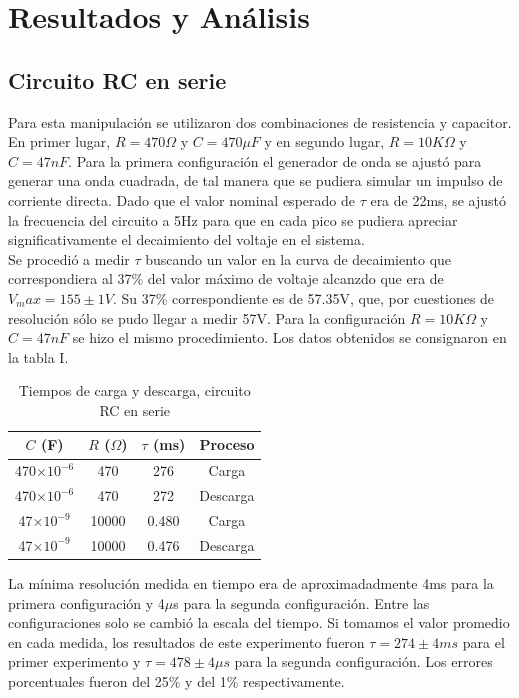 \documentclass[%
 reprint,
 amsmath,amssymb,
 aps,
]{revtex4-1}
\begin{document}
\section{\label{sec:level1}Resultados y An\'alisis}

\subsection{\label{sec:level2}Circuito RC en serie}
Para esta manipulaci\'on se utilizaron dos combinaciones de resistencia y capacitor. En primer lugar, $R = 470\Omega$ y $C=470\mu F$ y en segundo lugar, $R=10K\Omega$ y $C = 47nF$. Para la primera configuraci\'on el generador de onda se ajust\'o para generar una onda cuadrada, de tal manera que se pudiera simular un impulso de corriente directa. Dado que el valor nominal esperado de $\tau$ era de 22ms, se ajust\'o la frecuencia del circuito a 5Hz para que en cada pico se pudiera apreciar significativamente el decaimiento del voltaje en el sistema.\\

Se procedi\'o a medir $\tau$ buscando un valor en la curva de decaimiento que correspondiera al 37\% del valor m\'aximo de voltaje alcanzdo que era de $V_max=155\pm 1V$. Su 37\% correspondiente es de 57.35V, que, por cuestiones de resoluci\'on s\'olo se pudo llegar a medir 57V. Para la configuración $R=10K\Omega$ y $C = 47nF$ se hizo el mismo procedimiento. Los datos obtenidos se consignaron en la tabla I.\\

\begin{table}[h!]
\centering
\begin{tabular}{|c|c|c|c|}
\hline
$C$ (F) & $R$ ($\Omega$) & $\tau$ (ms) & Proceso\\
\hline
470$\times 10^{-6}$ & 470 & 276 & Carga\\
470$\times 10^{-6}$ & 470 & 272 & Descarga\\
47$\times 10^{-9}$ & 10000 & 0.480 & Carga\\
47$\times 10^{-9}$ & 10000 & 0.476 & Descarga\\
\hline
\end{tabular}
\caption{Tiempos de carga y descarga, circuito RC en serie}
\end{table}

La mínima resolución medida en tiempo era de aproximadadmente 4ms para la primera configuración y 4$\mu$s para la segunda configuración. Entre las configuraciones solo se cambió la escala del tiempo. Si tomamos el valor promedio en cada medida, los resultados de este experimento fueron $\tau = 274 \pm 4ms$ para el primer experimento y $\tau = 478 \pm 4\mu s$ para la  segunda configuración. Los errores porcentuales fueron del  25\% y del 1\% respectivamente. \\
\end{document}

